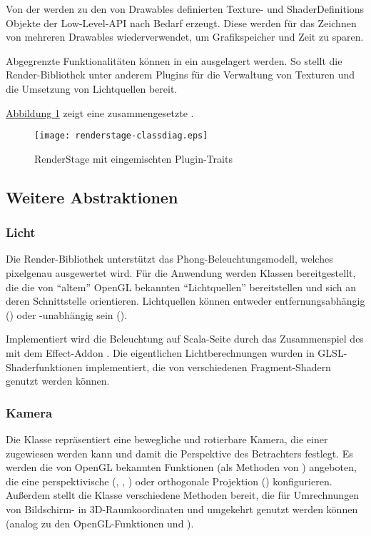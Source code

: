 \documentclass[a4paper,10pt]{sphinxmanual}
\begin{document}
Von der  werden zu den von Drawables definierten Texture- und ShaderDefinitions Objekte der Low-Level-API nach Bedarf erzeugt.
Diese werden für das Zeichnen von mehreren Drawables wiederverwendet, um Grafikspeicher und Zeit zu sparen.

Abgegrenzte Funktionalitäten können in ein  ausgelagert werden.
So stellt die Render-Bibliothek unter anderem Plugins für die Verwaltung von Texturen und die Umsetzung von Lichtquellen bereit.

\hyperref[renderbib:renderstage-classdiag]{Abbildung  \ref*{renderbib:renderstage-classdiag}} zeigt eine zusammengesetzte .
\begin{figure}[htbp]
\centering
\capstart

\texttt{[image: renderstage-classdiag.eps]}
\caption{RenderStage mit eingemischten Plugin-Traits}\label{renderbib:renderstage-classdiag}\end{figure}


\subsection{Weitere Abstraktionen}
\label{renderbib:weitere-abstraktionen}

\subsubsection{Licht}
\label{renderbib:licht}
Die Render-Bibliothek unterstützt das Phong-Beleuchtungsmodell, welches pixelgenau ausgewertet wird.
Für die Anwendung werden Klassen bereitgestellt, die die von "`altem"' OpenGL bekannten "`Lichtquellen"' bereitstellen und sich an deren Schnittstelle orientieren.
Lichtquellen können entweder entfernungsabhängig () oder -unabhängig sein ().

Implementiert wird die Beleuchtung auf Scala-Seite durch das Zusammenspiel des  mit dem Effect-Addon .
Die eigentlichen Lichtberechnungen wurden in GLSL-Shaderfunktionen implementiert, die von verschiedenen Fragment-Shadern genutzt werden können.


\subsubsection{Kamera}
\label{renderbib:kamera}
Die Klasse  repräsentiert eine bewegliche und rotierbare Kamera, die einer  zugewiesen werden kann und damit die Perspektive des Betrachters festlegt.
Es werden die von OpenGL bekannten Funktionen (als Methoden von ) angeboten, die eine perspektivische (, , ) oder orthogonale Projektion () konfigurieren.
Außerdem stellt die Klasse verschiedene Methoden bereit, die für Umrechnungen von Bildschirm- in 3D-Raumkoordinaten und umgekehrt genutzt werden können (analog zu den OpenGL-Funktionen  und ).
\end{document}
